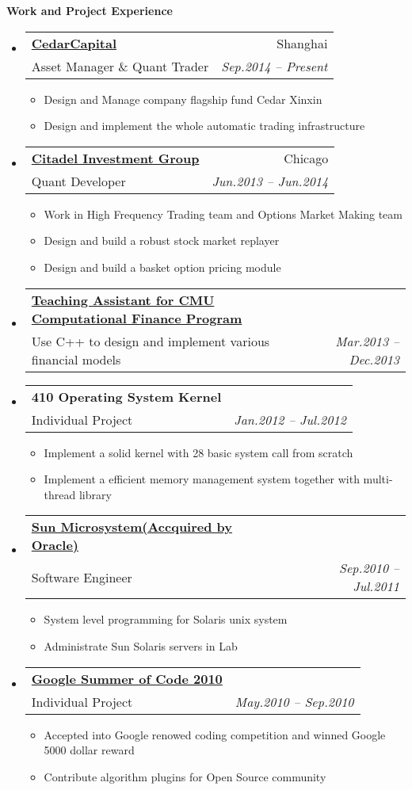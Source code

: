 \documentclass[letterpaper,11pt]{article}
\makeatletter
\newcommand{\resitem}[1]{\item #1 \vspace{-2pt}}
\newcommand{\resheading}[1]{{\large \colorbox{mygrey}{\begin{minipage}{\textwidth}{\textbf{#1 \vphantom{p\^{E}}}}\end{minipage}}}}
\newcommand{\ressubheading}[4]{
\begin{tabular*}{6.5in}{l@{\extracolsep{\fill}}r}
		\textbf{#1} & #2 \\
		{#3}{} & \textit{#4} \\
\end{tabular*}\vspace{-6pt}}
\makeatother
\begin{document}
\resheading{Work and Project Experience}
	\begin{itemize}
    \item
      \ressubheading{\href{http://www.cedarcapital.cn}
      {CedarCapital}}{Shanghai}
      {Asset Manager \& Quant Trader}{Sep.2014 -- Present}
      {\footnotesize
				\begin{itemize}
					\resitem{Design and Manage company flagship fund Cedar Xinxin}
          \resitem{Design and implement the whole automatic trading infrastructure}
				\end{itemize}
			}
      
    \item
      \ressubheading{\href{http://www.citadel.com}
      {Citadel Investment Group}}{Chicago}
      {Quant Developer}{Jun.2013 -- Jun.2014}
      {\footnotesize
				\begin{itemize}
					\resitem{Work in High Frequency Trading team and 
          Options Market Making team}
          \resitem{Design and build a robust stock market replayer}
          \resitem{Design and build a basket option pricing module}
				\end{itemize}
			}

    \item 
			\ressubheading{
      \href{http://tepper.cmu.edu/master-in-computational-finance/index.aspx}
      {Teaching Assistant for CMU Computational Finance Program}}
      {}{Use C++ to design and implement various financial models}
      {Mar.2013 -- Dec.2013}
      
    \item 
			\ressubheading{410 Operating System Kernel}{}
      {Individual Project}{Jan.2012 -- Jul.2012}
      { \footnotesize
				\begin{itemize}
          \resitem{Implement a solid kernel with 28 basic system call from scratch}
					\resitem{Implement a efficient memory management system together with multi-thread library}
				\end{itemize}
			}

		\item 
			\ressubheading{\href{http://www.oracle.com/us/sun/index.html}
      {Sun Microsystem(Accquired by Oracle)}}{}
      {Software Engineer}
      {Sep.2010 -- Jul.2011}
      { \footnotesize
				\begin{itemize}
					\resitem{System level programming for Solaris unix system}
					\resitem{Administrate Sun Solaris servers in Lab}
				\end{itemize}
			}

		\item 
      \ressubheading{\href{http://code.google.com/soc/}{Google Summer of Code 2010}}{}{Individual Project}{May.2010 -- Sep.2010}
				{ \footnotesize
				\begin{itemize}
				  \resitem{Accepted into Google renowed coding competition and winned Google 5000 dollar reward}	
          \resitem{Contribute algorithm plugins for Open Source community}
				\end{itemize}
				}
	\end{itemize}
\end{document}
